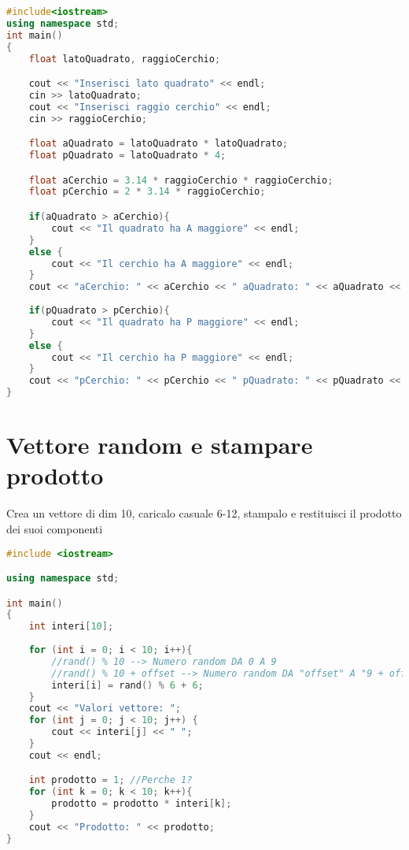 \documentclass{article}
\begin{document}
\begin{lstlisting}[language=C++]
#include<iostream>
using namespace std;
int main()
{
    float latoQuadrato, raggioCerchio;

    cout << "Inserisci lato quadrato" << endl;
    cin >> latoQuadrato;
    cout << "Inserisci raggio cerchio" << endl;
    cin >> raggioCerchio;

    float aQuadrato = latoQuadrato * latoQuadrato;
    float pQuadrato = latoQuadrato * 4;

    float aCerchio = 3.14 * raggioCerchio * raggioCerchio;
    float pCerchio = 2 * 3.14 * raggioCerchio;

    if(aQuadrato > aCerchio){
        cout << "Il quadrato ha A maggiore" << endl;
    }
    else {
        cout << "Il cerchio ha A maggiore" << endl;
    }
    cout << "aCerchio: " << aCerchio << " aQuadrato: " << aQuadrato << endl;
    
    if(pQuadrato > pCerchio){
        cout << "Il quadrato ha P maggiore" << endl;
    }
    else {
        cout << "Il cerchio ha P maggiore" << endl;
    }
    cout << "pCerchio: " << pCerchio << " pQuadrato: " << pQuadrato << endl;
}
\end{lstlisting}
\vspace*{\fill}

\pagebreak
\section{Vettore random e stampare prodotto} Crea un vettore di dim 10, caricalo casuale 6-12, stampalo e restituisci il prodotto dei suoi componenti

\begin{lstlisting}[language=C++]
#include <iostream>

using namespace std;

int main()
{
    int interi[10];
    
    for (int i = 0; i < 10; i++){
        //rand() % 10 --> Numero random DA 0 A 9 
        //rand() % 10 + offset --> Numero random DA "offset" A "9 + offset"
        interi[i] = rand() % 6 + 6;
    }
    cout << "Valori vettore: ";
    for (int j = 0; j < 10; j++) {
        cout << interi[j] << " ";
    }
    cout << endl;

    int prodotto = 1; //Perche 1?   
    for (int k = 0; k < 10; k++){
        prodotto = prodotto * interi[k];
    }
    cout << "Prodotto: " << prodotto;
}
\end{lstlisting}
\vspace*{\fill}
\end{document}
